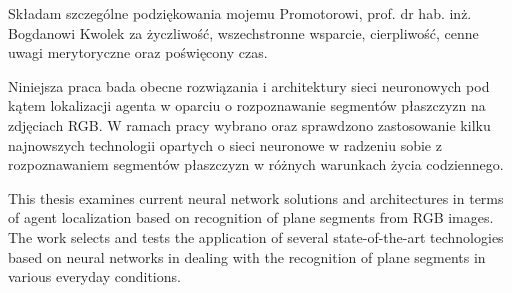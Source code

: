 \documentclass[english, print]{agh-wi} %
\author{Jan Rodzoń}
\begin{document}
\frontmatter %
\maketitle %
\cleardoublepage
\thispagestyle{empty}
\vspace*{\fill}
\begin{flushright}
    \em
    \begin{minipage}{0.75\textwidth}
        Składam szczególne podziękowania mojemu Promotorowi, prof. dr hab. inż. Bogdanowi Kwolek
		za życzliwość, wszechstronne wsparcie, cierpliwość, cenne uwagi merytoryczne oraz poświęcony czas.
    \end{minipage}
\end{flushright}
\begin{abstractPL}
Niniejsza praca bada obecne rozwiązania i architektury sieci neuronowych
pod kątem lokalizacji agenta w oparciu o rozpoznawanie segmentów płaszczyzn na zdjęciach RGB.
W ramach pracy wybrano oraz sprawdzono zastosowanie kilku najnowszych technologii
opartych o sieci neuronowe w radzeniu sobie z rozpoznawaniem segmentów płaszczyzn
w różnych warunkach życia codziennego.
\end{abstractPL}
\begin{abstractEN}
This thesis examines current neural network solutions and architectures
in terms of agent localization based on recognition of plane segments from RGB images.
The work selects and tests the application of several state-of-the-art technologies
based on neural networks in dealing with the recognition of plane segments
in various everyday conditions.
\end{abstractEN}
\tableofcontents   %
\listoffigures     %
\listoftables      %
\lstlistoflistings %

\mainmatter %






% 
% 


\printbibliography  %
\end{document}
